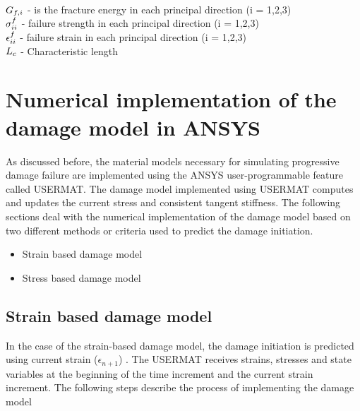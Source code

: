 \documentclass[12pt,openright,twoside]{report}
\begin{document}
\\ 
\\ 
\\
$\mathlarger{G_{f,i}}$ \; - \;is the fracture energy in each principal direction (i = 1,2,3)  \\ $\mathlarger{\sigma_{ii}^{f}}$ \;\;\; -  \;  failure strength in each principal direction (i = 1,2,3) \\ $\mathlarger{\epsilon_{ii}^{f}}$\;\;\;\;\; - \; failure strain in each principal direction (i = 1,2,3) \\ $\mathlarger{L_{c}}$\;\;\;\;\; - \; Characteristic length

\section{Numerical implementation of the damage model in ANSYS}
\indent\indent\indent  As discussed before, the material models necessary for simulating progressive damage failure are implemented using the ANSYS user-programmable feature called USERMAT. The damage model implemented using USERMAT computes and updates the current stress and consistent tangent stiffness. The following sections deal with the numerical implementation of the damage model based on two different methods or criteria used to predict the damage initiation.
\\
\begin{itemize}
\item Strain based damage model 
\item Stress based damage model 
\end{itemize}
\subsection{Strain based damage model}
\indent\indent\indent  In the case of the strain-based damage model, the damage initiation is predicted using current strain ($\epsilon_{n+1}$) \citep{wang2009three}.   The USERMAT receives strains, stresses and state variables at the beginning of the time increment and the current strain increment. The following steps describe the process of implementing the damage model
\end{document}
